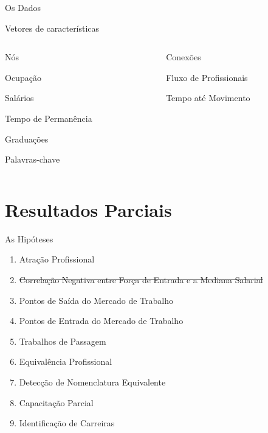 \documentclass[10pt, hyperref={pdfpagelabels=false}]{beamer}
\begin{document}
\begin{frame}[label=mapa-dados]{Os Dados}
  \begin{center}
    \Large
    Vetores de características
    
    \vspace{\baselineskip}
    
    \begin{columns}[T,onlytextwidth]
      \begin{column}{0.5\textwidth}
        \centering
        \alert{Nós}

        \large
        Ocupação
        
        Salários
        
        Tempo de Permanência
        
        Graduações
        
        Palavras-chave
      \end{column}
      
      \begin{column}{0.5\textwidth}
        \centering
        \alert{Conexões}

        \large
        Fluxo de Profissionais
          
        Tempo até Movimento
      \end{column}
    \end{columns}
  \end{center}
\end{frame}

\section{Resultados Parciais}

\begin{frame}[label=hipoteses]{As Hipóteses}
  \begin{enumerate}
    \item \alert{Atração Profissional}
    \item \sout{Correlação Negativa entre Força de Entrada e a Mediana Salarial}
    \item \alert{Pontos de Saída do Mercado de Trabalho}
    \item \alert{Pontos de Entrada do Mercado de Trabalho}
    \item Trabalhos de Passagem
    \item Equivalência Profissional 
    \item Detecção de Nomenclatura Equivalente 
    \item \alert{Capacitação Parcial}
    \item \alert{Identificação de Carreiras}
  \end{enumerate}
\end{frame}
\end{document}
